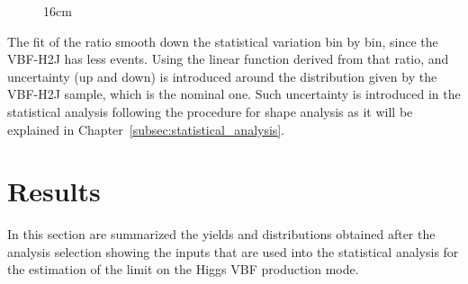 \begin{figure}[hbtp]{16cm}
	\label{fig:systematic_3rd_jet}
\end{figure}

The fit of the ratio smooth down the statistical variation bin by bin, since the VBF-H2J has less events. Using the linear function derived from that ratio, and uncertainty (up and down) is introduced around the distribution given by the VBF-H2J sample, which is the nominal one. Such uncertainty is introduced in the statistical analysis following the procedure for shape analysis as it will be explained in Chapter~\ref{subsec:statistical_analysis}.

\chapter{Results}
In this section are summarized the yields and distributions obtained after the analysis selection showing the inputs that are used into the statistical analysis for the estimation of the limit on the Higgs VBF production mode. 

